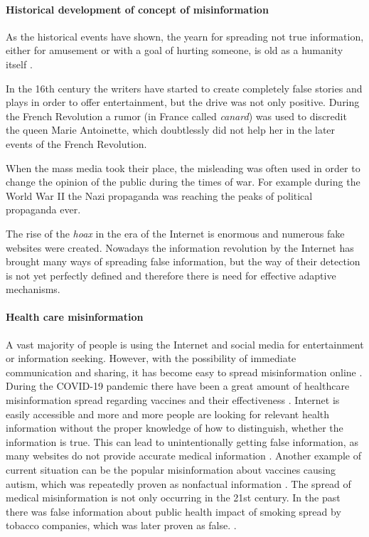 \documentclass[11pt ,english,a4paper]{article}
\begin{document}
\paragraph{Historical development of concept of misinformation}%
As the historical events have shown, the yearn for spreading not true information, either for amusement or with a goal of hurting someone, is old as a humanity itself \cite{bur17history}.

In the 16th century the writers have started to create completely false stories and plays in order to offer entertainment, but the drive was not only positive. During the French Revolution a rumor (in France called \emph{canard}) was used to discredit the queen Marie Antoinette, which doubtlessly did not help her in the later events of the French Revolution. \cite{bur17history} 

When the mass media took their place, the misleading was often used in order to change the opinion of the public during the times of war. For example during the World War II the Nazi propaganda was reaching the peaks of political propaganda ever. \cite{pos18short}

The rise of the \emph{hoax} in the era of the Internet is enormous and numerous fake websites were created.\cite{bur17history} Nowadays the information revolution by the Internet has brought many ways of spreading false information, but the way of their detection is not yet perfectly defined and therefore there is need for effective adaptive mechanisms.

\paragraph{Health care misinformation}
A vast majority of people is using the Internet and social media for entertainment or information seeking. However, with the possibility of immediate communication and sharing, it has become easy to spread misinformation online \cite{wa19sys}. During the COVID-19 pandemic there have been a great amount of healthcare misinformation spread regarding vaccines and their effectiveness \cite{chap22unmask}. Internet is easily accessible and more and more people are looking for relevant health information without the proper knowledge of how to distinguish, whether the information is true. This can lead to unintentionally getting false information, as many websites do not provide accurate medical information \cite{cook15misinfo}. Another example of current situation can be the popular misinformation about vaccines causing autism, which was repeatedly proven as nonfactual information \cite{wa19sys}. 
The spread of medical misinformation is not only occurring in the 21st century. In the past there was false information about public health impact of smoking spread by tobacco companies, which was later proven as false. \cite{cook15misinfo}.
\end{document}

